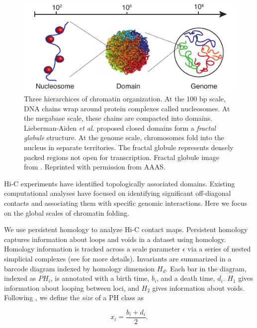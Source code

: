 \begin{figure}
       \centering
       \includegraphics[width=\columnwidth]{./fig/hic/chromatin_cartoon.pdf}
       \caption[Three Hierarchies of Chromatin Organization]{Three hierarchices of chromatin organization. At the 100 bp scale, DNA chains wrap around protein complexes called nucleosomes. At the megabase scale, these chains are compacted into domains. Lieberman-Aiden \emph{et al.} proposed closed domains form a \emph{fractal globule} structure. At the genome scale, chromosomes fold into the nucleus in separate territories. The fractal globule represents densely packed regions not open for transcription. Fractal globule image from \cite{LiebermanAiden:2009jz}. Reprinted with permission from AAAS.}
       \label{fig:chromatin_cartoon}
\end{figure}

Hi-C experiments have identified topologically associated domains.
Existing computational analyses have focused on identifying significant off-diagonal contacts and associating them with specific genomic interactions.
Here we focus on the global scales of chromatin folding.

We use persistent homology to analyze Hi-C contact maps.
Persistent homology captures information about loops and voids in a dataset using homology.
Homology information is tracked across a scale parameter $\epsilon$ via a series of nested simplicial complexes (see \cite{Carlsson:2014cn} for more details).
Invariants are summarized in a barcode diagram indexed by homology dimension $H_d$.
Each bar in the diagram, indexed as $PH_{i}$, is annotated with a birth time, $b_i$, and a death time, $d_i$.
$H_1$ gives information about looping between loci, and $H_2$ gives information about voids.
Following \cite{MacPherson:2012eq}, we define the \emph{size} of a PH class as

\begin{equation}
x_i = \frac{b_i+d_i}{2}.
\end{equation}

